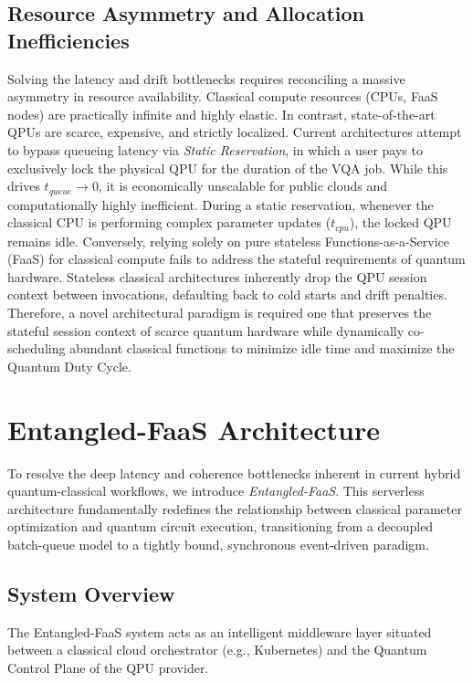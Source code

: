 \documentclass[conference]{IEEEtran}
\begin{document}
\subsection{Resource Asymmetry and Allocation Inefficiencies}
Solving the latency and drift bottlenecks requires reconciling a massive asymmetry in resource availability. Classical compute resources (CPUs, FaaS nodes) are practically infinite and highly elastic. In contrast, state-of-the-art QPUs are scarce, expensive, and strictly localized.
Current architectures attempt to bypass queueing latency via \textit{Static Reservation}, in which a user pays to exclusively lock the physical QPU for the duration of the VQA job. While this drives $t_{queue} \to 0$, it is economically unscalable for public clouds and computationally highly inefficient. During a static reservation, whenever the classical CPU is performing complex parameter updates ($t_{cpu}$), the locked QPU remains idle. 
Conversely, relying solely on pure stateless Functions-as-a-Service (FaaS) for classical compute fails to address the stateful requirements of quantum hardware. Stateless classical architectures inherently drop the QPU session context between invocations, defaulting back to cold starts and drift penalties. Therefore, a novel architectural paradigm is required one that preserves the stateful session context of scarce quantum hardware while dynamically co-scheduling abundant classical functions to minimize idle time and maximize the Quantum Duty Cycle.

\section{Entangled-FaaS Architecture}
\label{sec:architecture}

To resolve the deep latency and coherence bottlenecks inherent in current hybrid quantum-classical workflows, we introduce \textit{Entangled-FaaS}. This serverless architecture fundamentally redefines the relationship between classical parameter optimization and quantum circuit execution, transitioning from a decoupled batch-queue model to a tightly bound, synchronous event-driven paradigm.

\subsection{System Overview}
The Entangled-FaaS system acts as an intelligent middleware layer situated between a classical cloud orchestrator (e.g., Kubernetes) and the Quantum Control Plane of the QPU provider. 
\end{document}
